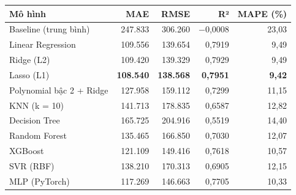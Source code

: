 \begin{tabular}{lrrrr}
\toprule
Mô hình & MAE & RMSE & R² & MAPE (\%) \\
\midrule
Baseline (trung bình) & 247{.}833 & 306{.}260 & \ensuremath{-}0{,}0008 & 23{,}03 \\
Linear Regression & 109{.}556 & 139{.}654 & 0{,}7919 & 9{,}49 \\
Ridge (L2) & 109{.}420 & 139{.}329 & 0{,}7929 & 9{,}49 \\
Lasso (L1) & \textbf{108{.}540} & \textbf{138{.}568} & \textbf{0{,}7951} & \textbf{9{,}42} \\
Polynomial bậc 2 + Ridge & 127{.}958 & 159{.}112 & 0{,}7299 & 11{,}15 \\
KNN (k = 10) & 141{.}713 & 178{.}835 & 0{,}6587 & 12{,}82 \\
Decision Tree & 165{.}725 & 204{.}916 & 0{,}5519 & 14{,}40 \\
Random Forest & 135{.}465 & 166{.}850 & 0{,}7030 & 12{,}07 \\
XGBoost & 121{.}109 & 149{.}416 & 0{,}7618 & 10{,}57 \\
SVR (RBF) & 138{.}210 & 170{.}313 & 0{,}6905 & 12{,}15 \\
MLP (PyTorch) & 117{.}269 & 146{.}663 & 0{,}7705 & 10{,}33 \\
\bottomrule
\end{tabular}

